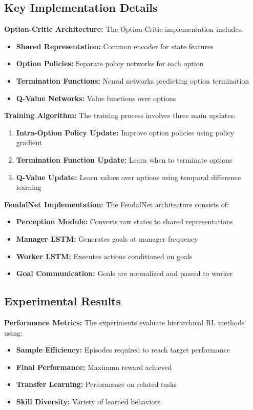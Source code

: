 \documentclass[12pt]{article}
\begin{document}
{{\subsection{Key Implementation Details}

\textbf{Option-Critic Architecture:}
The Option-Critic implementation includes:
\begin{itemize}
    \item \textbf{Shared Representation:} Common encoder for state features
    \item \textbf{Option Policies:} Separate policy networks for each option
    \item \textbf{Termination Functions:} Neural networks predicting option termination
    \item \textbf{Q-Value Networks:} Value functions over options
\end{itemize}

\textbf{Training Algorithm:}
The training process involves three main updates:
\begin{enumerate}
    \item \textbf{Intra-Option Policy Update:} Improve option policies using policy gradient
    \item \textbf{Termination Function Update:} Learn when to terminate options
    \item \textbf{Q-Value Update:} Learn values over options using temporal difference learning
    \end{enumerate}

\textbf{FeudalNet Implementation:}
The FeudalNet architecture consists of:
\begin{itemize}
    \item \textbf{Perception Module:} Converts raw states to shared representations
    \item \textbf{Manager LSTM:} Generates goals at manager frequency
    \item \textbf{Worker LSTM:} Executes actions conditioned on goals
    \item \textbf{Goal Communication:} Goals are normalized and passed to worker
\end{itemize}

\subsection{Experimental Results}

\textbf{Performance Metrics:}
The experiments evaluate hierarchical RL methods using:
\begin{itemize}
    \item \textbf{Sample Efficiency:} Episodes required to reach target performance
    \item \textbf{Final Performance:} Maximum reward achieved
    \item \textbf{Transfer Learning:} Performance on related tasks
    \item \textbf{Skill Diversity:} Variety of learned behaviors
\end{itemize}

}}
\end{document}
